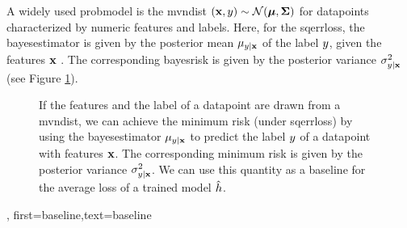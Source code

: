 {{{{A widely used \gls{probmodel} is the \gls{mvndist} $\left( {\bf x},y \right) \sim \mathcal{N}({\bm \mu},{\bm \Sigma})$ 
for \gls{datapoint}s characterized by numeric \gls{feature}s and \gls{label}s.
Here, for the \gls{sqerrloss}, the \gls{bayesestimator} is given by the posterior 
\gls{mean} $\mu_{y|{\bf x}}$ of the \gls{label} $y$, given the 
\gls{feature}s ${\bf x}$ \cite{LC,GrayProbBook}. The corresponding \gls{bayesrisk} 
is given by the posterior \gls{variance} 
$\sigma^{2}_{y|{\bf x}}$ (see Figure \ref{fig_post_baseline_dict}).
	\begin{figure}[H]
		\begin{center}
		\end{center}
		\caption{If the \gls{feature}s and the \gls{label} of a \gls{datapoint} are drawn from a \gls{mvndist}, we 
		can achieve the \gls{minimum} \gls{risk} (under \gls{sqerrloss}) by using the \gls{bayesestimator} $\mu_{y|{\bf x}}$ 
		to predict the \gls{label} $y$ of a \gls{datapoint} with \gls{feature}s ${\bf x}$. The corresponding 
		\gls{minimum} \gls{risk} is given by the posterior \gls{variance} $\sigma^{2}_{y|{\bf x}}$. We can use 
		this quantity as a baseline for the average \gls{loss} of a trained \gls{model} $\hat{h}$. \label{fig_post_baseline_dict}}
	\end{figure}},
    first={baseline},text={baseline}
}

}}
